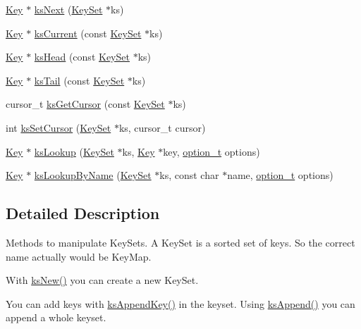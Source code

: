 \begin{DoxyCompactItemize}
\item 
\hyperlink{struct__Key}{Key} $\ast$ \hyperlink{group__keyset_ga317321c9065b5a4b3e33fe1c399bcec9}{ksNext} (\hyperlink{struct__KeySet}{KeySet} $\ast$ks)
\item 
\hyperlink{struct__Key}{Key} $\ast$ \hyperlink{group__keyset_ga4287b9416912c5f2ab9c195cb74fb094}{ksCurrent} (const \hyperlink{struct__KeySet}{KeySet} $\ast$ks)
\item 
\hyperlink{struct__Key}{Key} $\ast$ \hyperlink{group__keyset_gae7dbf3aef70e67b5328475eb3d1f92f5}{ksHead} (const \hyperlink{struct__KeySet}{KeySet} $\ast$ks)
\item 
\hyperlink{struct__Key}{Key} $\ast$ \hyperlink{group__keyset_gadca442c4ab43cf532b15091d7711559e}{ksTail} (const \hyperlink{struct__KeySet}{KeySet} $\ast$ks)
\item 
cursor\_\-t \hyperlink{group__keyset_gaffe507ab9281c322eb16c3e992075d29}{ksGetCursor} (const \hyperlink{struct__KeySet}{KeySet} $\ast$ks)
\item 
int \hyperlink{group__keyset_gad94c9ffaa3e8034564c0712fd407c345}{ksSetCursor} (\hyperlink{struct__KeySet}{KeySet} $\ast$ks, cursor\_\-t cursor)
\item 
\hyperlink{struct__Key}{Key} $\ast$ \hyperlink{group__keyset_gaa34fc43a081e6b01e4120daa6c112004}{ksLookup} (\hyperlink{struct__KeySet}{KeySet} $\ast$ks, \hyperlink{struct__Key}{Key} $\ast$key, \hyperlink{group__kdb_ga98a3d6a4016c9dad9cbd1a99a9c2a45a}{option\_\-t} options)
\item 
\hyperlink{struct__Key}{Key} $\ast$ \hyperlink{group__keyset_gad2e30fb6d4739d917c5abb2ac2f9c1a1}{ksLookupByName} (\hyperlink{struct__KeySet}{KeySet} $\ast$ks, const char $\ast$name, \hyperlink{group__kdb_ga98a3d6a4016c9dad9cbd1a99a9c2a45a}{option\_\-t} options)
\end{DoxyCompactItemize}


\subsection{Detailed Description}
Methods to manipulate KeySets. A KeySet is a sorted set of keys. So the correct name actually would be KeyMap.

With \hyperlink{group__keyset_ga671e1aaee3ae9dc13b4834a4ddbd2c3c}{ksNew()} you can create a new KeySet.

You can add keys with \hyperlink{group__keyset_gaa5a1d467a4d71041edce68ea7748ce45}{ksAppendKey()} in the keyset. Using \hyperlink{group__keyset_ga21eb9c3a14a604ee3a8bdc779232e7b7}{ksAppend()} you can append a whole keyset.

